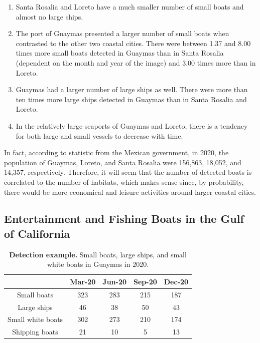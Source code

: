\begin{enumerate}
    \item Santa Rosalia and Loreto have a much smaller number of small boats and almost no large ships.
    \item The port of Guaymas presented a larger number of small boats when contrasted to the other two coastal cities. There were between 1.37 and 8.00 times more small boats detected in Guaymas than in Santa Rosalia (dependent on the month and year of the image) and 3.00 times more than in Loreto. 
    \item Guaymas had a larger number of large ships as well. There were more than ten times more large ships detected in Guaymas than in Santa Rosalia and Loreto.
    \item In the relatively large seaports of Guaymas and Loreto, there is a tendency for both large and small vessels to decrease with time.
\end{enumerate}

In fact, according to statistic\cite{INEGI2022Population} from the Mexican government, in 2020, the population of Guaymas, Loreto, and Santa Rosalia were 156,863, 18,052, and 14,357, respectively. Therefore, it will seem that the number of detected boats is correlated to the number of habitats, which makes sense since, by probability, there would be more economical and leisure activities around larger coastal cities.


\subsection{Entertainment and Fishing Boats in the Gulf of California}



\begin{table}[t]
\center
\begin{tabular}{|c|c|c|c|c|}
\hline
                                &  Mar-20   & Jun-20    & Sep-20    & Dec-20\\ \hline
   Small boats                  &  323      & 283       & 215       & 187   \\ \hline
   Large ships                  &  46       & 38        & 50        & 43    \\ \hline
   Small white boats            &  302      & 273       & 210       & 174   \\ \hline
   Shipping boats               &  21       & 10        & 5         & 13    \\ \hline
\end{tabular}
\caption{\textbf{Detection example.} Small boats, large ships, and small white boats in Guaymas in 2020.}
\label{Guaymas_2020}
\end{table}

